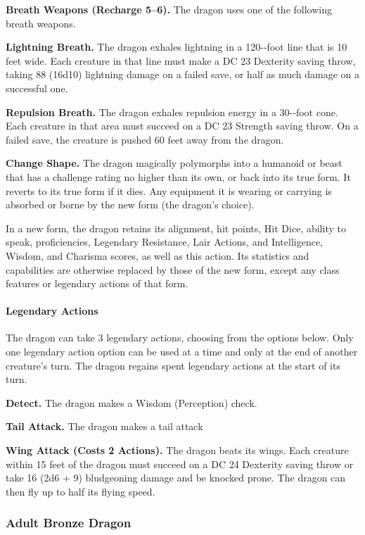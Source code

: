 \documentclass[
]{article}
\begin{document}
\textbf{Breath Weapons (Recharge 5--6).} The dragon uses one of the
following breath weapons.

\textbf{Lightning Breath.} The dragon exhales lightning in a 120-­‐foot
line that is 10 feet wide. Each creature in that line must make a DC 23
Dexterity saving throw, taking 88 (16d10) lightning damage on a failed
save, or half as much damage on a successful one.

\textbf{Repulsion Breath.} The dragon exhales repulsion energy in a
30-­‐foot cone. Each creature in that area must succeed on a DC 23
Strength saving throw. On a failed save, the creature is pushed 60 feet
away from the dragon.

\textbf{Change Shape.} The dragon magically polymorphs into a humanoid
or beast that has a challenge rating no higher than its own, or back
into its true form. It reverts to its true form if it dies. Any
equipment it is wearing or carrying is absorbed or borne by the new form
(the dragon's choice).

In a new form, the dragon retains its alignment, hit points, Hit Dice,
ability to speak, proficiencies, Legendary Resistance, Lair Actions, and
Intelligence, Wisdom, and Charisma scores, as well as this action. Its
statistics and capabilities are otherwise replaced by those of the new
form, except any class features or legendary actions of that form.

\hypertarget{legendary-actions-12}{%
\paragraph{Legendary Actions}\label{legendary-actions-12}}

The dragon can take 3 legendary actions, choosing from the options
below. Only one legendary action option can be used at a time and only
at the end of another creature's turn. The dragon regains spent
legendary actions at the start of its turn.

\textbf{Detect.} The dragon makes a Wisdom (Perception) check.

\textbf{Tail Attack.} The dragon makes a tail attack

\textbf{Wing Attack (Costs 2 Actions).} The dragon beats its wings. Each
creature within 15 feet of the dragon must succeed on a DC 24 Dexterity
saving throw or take 16 (2d6 + 9) bludgeoning damage and be knocked
prone. The dragon can then fly up to half its flying speed.

\hypertarget{adult-bronze-dragon}{%
\subsubsection{Adult Bronze Dragon}\label{adult-bronze-dragon}}
\end{document}
